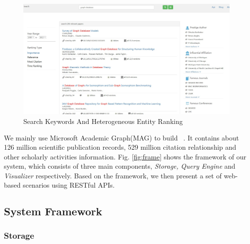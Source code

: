 \begin{figure}[tp]
\centering
\includegraphics[width=\textwidth]{searchKeywords110.pdf}
\caption{Search Keywords And Heterogeneous Entity Ranking}
\label{fig: search keywords}
\vspace{-3ex}
\end{figure}

\par
We mainly use Microsoft Academic Graph(MAG) to build \oursystem ~\cite{sinha2015overview}. It contains about 126 million scientific publication records, 529 million citation relationship and other scholarly activities information. Fig. \ref{fig:frame} shows the framework of our system, which consists of three main components, \emph{Storage, Query Engine} and \emph{Visualizer} respectively. Based on the framework, we then present a set of web-based scenarios using RESTful APIs.

\subsection{System Framework}

\subsubsection{Storage}

